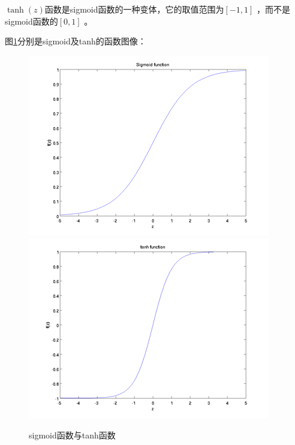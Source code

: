 $\tanh(z)$函数是sigmoid函数的一种变体，它的取值范围为$[-1,1]$ ，而不是sigmoid函数的$[0,1]$ 。\par
图\ref{fig_2_2}分别是sigmoid及tanh的函数图像：
\begin{figure}[!h]
	\centering
	\includegraphics[scale=0.8]{figures/chapter_2/Sigmoid_Function.png}
	\includegraphics[scale=0.8]{figures/chapter_2/Tanh_Function.png}
	\caption{sigmoid函数与tanh函数}\label{fig_2_2}
\end{figure}


